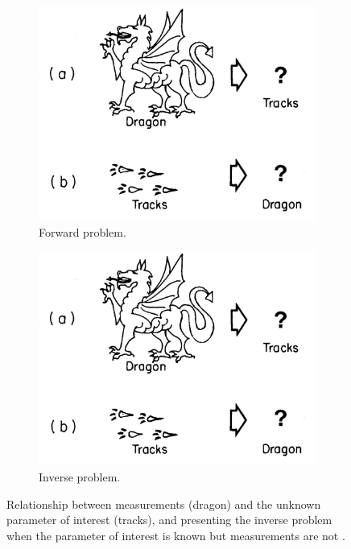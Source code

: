 \begin{figure}
	\vspace{-\normalbaselineskip}
	\centering
	\begin{subfigure}[b]{0.4\textwidth}
		\includegraphics[trim={6cm, 8.8cm, 0cm, 0cm},clip,width=\textwidth]{./fig_instruments/Dragon_track.png}
		\caption{Forward problem.}\label{fig:dragon:forward}
	\end{subfigure}
	
	\begin{subfigure}[b]{0.4\textwidth}
		\includegraphics[trim={6cm, .8cm, 0cm, 14.8cm},clip,width=\textwidth]{./fig_instruments/Dragon_track.png}
		\caption{Inverse problem.}\label{fig:dragon:inverse}
	\end{subfigure}
	
	\caption{\protect{} Relationship between measurements (dragon) and the unknown parameter of interest (tracks), and \protect{} presenting the inverse problem when the parameter of interest is known but measurements are not \citep{stephens_remote_1994}.}\label{fig:dragon}
	\vspace{-\normalbaselineskip} 
\end{figure}

